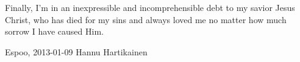 \documentclass[12pt,a4paper,oneside]{report}
\newcommand{\DATE}{2013-01-09}
\newcommand{\AUTHOR}{Hannu Hartikainen}
\begin{document}
Finally, I'm in an inexpressible and incomprehensible debt to my savior Jesus Christ, who has died for my sins and always loved me no matter how much sorrow I have caused Him.

\vskip 10mm

\noindent Espoo, \DATE
\vskip 5mm
\noindent\AUTHOR




\cleardoublepage
\tableofcontents

\label{pages-prelude}
\cleardoublepage


\startfirstchapter

\pagestyle{headings}





% 




\nocite{*}
\printbibliography[heading=bibintoc]


%

\end{document}
